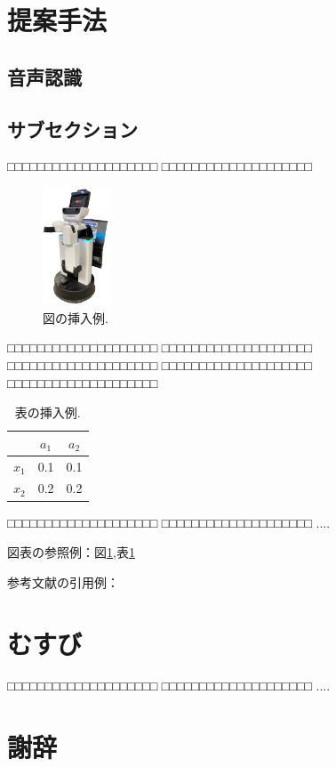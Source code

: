 \documentclass[a4j]{jarticle}
\begin{document}
\section{提案手法}

\subsection{音声認識}


\subsection{サブセクション}
□□□□□□□□□□□□□□□□□□□□
□□□□□□□□□□□□□□□□□□□□
%
\begin{figure}[ht]
  \centering
  \includegraphics[width=2cm]{images/hsr_front.png}
  \caption{図の挿入例.}
  \label{fig:ex1}
\end{figure}
%
□□□□□□□□□□□□□□□□□□□□
□□□□□□□□□□□□□□□□□□□□
□□□□□□□□□□□□□□□□□□□□
□□□□□□□□□□□□□□□□□□□□
□□□□□□□□□□□□□□□□□□□□
%
\begin{table}[h]
  \centering
  \caption {表の挿入例.}
  \label{table:ex1}
  \begin{tabular}{c|cc}
    \hline
           & $a_1$ & $a_2$ \\ \hline
    $x_1$  &  0.1  &  0.1  \\
    $x_2$  &  0.2  &  0.2  \\ \hline
  \end{tabular}
\end{table}
%
□□□□□□□□□□□□□□□□□□□□
□□□□□□□□□□□□□□□□□□□□
....

図表の参照例：図\ref{fig:ex1},表\ref{fig:ex1}

参考文献の引用例：\cite{Sample1}\cite{Sample2}


\section{むすび}
□□□□□□□□□□□□□□□□□□□□
□□□□□□□□□□□□□□□□□□□□
....


\section*{謝辞}
\end{document}
